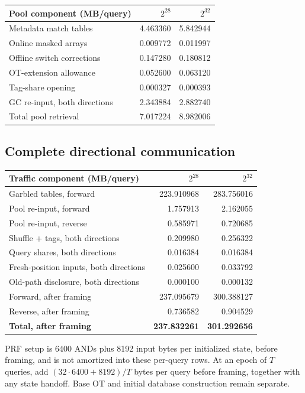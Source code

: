 \begin{center}\small
\begin{tabular}{lrr}\toprule
Pool component (MB/query) & $2^{28}$ & $2^{32}$\\\midrule
Metadata match tables & 4.463360 & 5.842944\\
Online masked arrays & 0.009772 & 0.011997\\
Offline switch corrections & 0.147280 & 0.180812\\
OT-extension allowance & 0.052600 & 0.063120\\
Tag-share opening & 0.000327 & 0.000393\\
GC re-input, both directions & 2.343884 & 2.882740\\
Total pool retrieval & 7.017224 & 8.982006\\
\bottomrule\end{tabular}
\end{center}

\subsection{Complete directional communication}

\begin{center}\small
\begin{tabular}{lrr}\toprule
Traffic component (MB/query) & $2^{28}$ & $2^{32}$\\\midrule
Garbled tables, forward & 223.910968 & 283.756016\\
Pool re-input, forward & 1.757913 & 2.162055\\
Pool re-input, reverse & 0.585971 & 0.720685\\
Shuffle + tags, both directions & 0.209980 & 0.256322\\
Query shares, both directions & 0.016384 & 0.016384\\
Fresh-position inputs, both directions & 0.025600 & 0.033792\\
Old-path disclosure, both directions & 0.000100 & 0.000132\\
\midrule Forward, after framing & 237.095679 & 300.388127\\
Reverse, after framing & 0.736582 & 0.904529\\
\textbf{Total, after framing} & \textbf{237.832261} & \textbf{301.292656}\\
\bottomrule\end{tabular}
\end{center}

PRF setup is 6400 ANDs plus 8192 input bytes per
initialized state, before framing, and is not amortized into these per-query
rows. At an epoch of $T$ queries, add $(32\cdot6400+8192)/T$ bytes per query
before framing, together with any state handoff. Base OT and initial database
construction remain separate.

